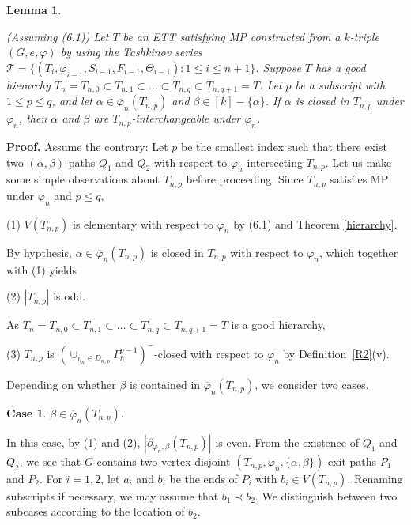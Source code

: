 \documentclass[11pt]{article}
\newtheorem{lemma}[theorem]{Lemma}
\newcommand{\TT}{\mathcal {T}}
\newcommand{\phibar}{\overline{\varphi}}
\newcommand{\phiv}{\varphi}
\begin{document}
%

\begin{lemma}\label{step1}

(Assuming (6.1)) Let $T$ be an ETT satisfying MP constructed from a $k$-triple $(G,e, \varphi)$ by using the Tashkinov series 
$\TT=\{(T_i, \phiv_{i-1}, S_{i-1}, F_{i-1}, \Theta_{i-1}): 1\le i \le n+1\}$. Suppose $T$ has a good hierarchy 
$T_n=T_{n,0} \subset T_{n,1} \subset \ldots \subset T_{n,q} \subset T_{n,q+1}=T$. Let $p$ be a subscript with
$1\le p \le q$, and let $\alpha \in \overline{\varphi}_n(T_{n,p})$ and $\beta \in [k]-\{\alpha\}$.  If $\alpha$ is 
closed in $T_{n,p}$ under $\varphi_n$, then $\alpha$ and $\beta$ are $T_{n,p}$-interchangeable under $\varphi_n$.
\end{lemma}	


{\bf Proof.} 	Assume the contrary: Let $p$ be the smallest index such that there exist two $(\alpha,\beta)$-paths $Q_1$ and $Q_2$ 
with respect to $\varphi_n$ intersecting $T_{n,p}$.  Let us make some simple observations about $T_{n,p}$ before proceeding. 
Since $T_{n,p}$ satisfies MP under $\varphi_n$ and $p\leq q$,

(1) $V(T_{n,p})$ is elementary with respect to $\varphi_n$
by (6.1) and  Theorem \ref{hierarchy}.

\noindent By hypthesis, $\alpha\in\phibar_n(T_{n,p})$ is closed in $T_{n,p}$ with respect to $\varphi_n$, which together with (1) yields

(2) $|T_{n,p}|$ is odd.

\noindent As $T_n=T_{n,0} \subset T_{n,1} \subset \ldots \subset T_{n,q} \subset T_{n,q+1}=T$ is a good hierarchy, 

(3) $T_{n,p}$ is $(\cup_{\eta_h\in D_{n,p}}\Gamma^{p-1}_h)^-$-closed with respect to $\varphi_n$ by Definition~\ref{R2}(v).

Depending on whether $\beta$ is contained in $\overline{\varphi}_n(T_{n,p})$, we consider two cases. 


{\bf Case 1}. $\beta\in \overline{\varphi}_n(T_{n,p})$.
	
In this case, by (1) and (2), $|\partial_{\varphi_n, \beta}(T_{n,p})|$ is even. From the existence of $Q_1$ and $Q_2$, we see that
$G$ contains two vertex-disjoint $(T_{n,p}, \varphi_n, \{\alpha,\beta\})$-exit paths $P_1$ and $P_2$. 
For $i=1,2$, let $a_i$ and $b_i$ be the ends of $P_i$ with $b_i \in V(T_{n,p})$. Renaming subscripts if necessary, we may assume 
that $b_1 \prec b_2$.  We distinguish between two subcases according to the location of $b_2$.
\end{document}
